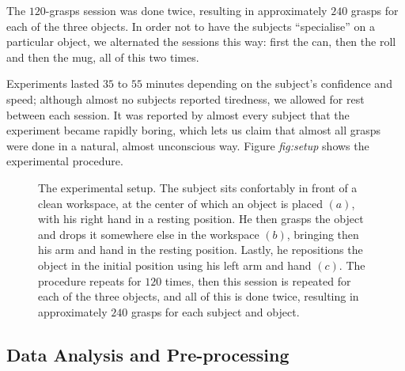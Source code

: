 The $120$-grasps session was done twice, resulting in approximately
$240$ grasps for each of the three objects. In order not to have the
subjects ``specialise'' on a particular object, we alternated the
sessions this way: first the can, then the roll and then the mug, all
of this two times.

Experiments lasted $35$ to $55$ minutes depending on the subject's
confidence and speed; although almost no subjects reported tiredness,
we allowed for rest between each session. It was reported by almost
every subject that the experiment became rapidly boring, which lets us
claim that almost all grasps were done in a natural, almost
unconscious way. Figure \emph{fig:setup} shows the experimental
procedure.

\begin{figure}[htbp]
  \begin{center}
    \caption{The experimental setup. The subject sits confortably in
    front of a clean workspace, at the center of which an object is
    placed $(a)$, with his right hand in a resting position. He then
    grasps the object and drops it somewhere else in the workspace
    $(b)$, bringing then his arm and hand in the resting
    position. Lastly, he repositions the object in the initial
    position using his left arm and hand $(c)$. The procedure repeats
    for $120$ times, then this session is repeated for each of the
    three objects, and all of this is done twice, resulting in
    approximately $240$ grasps for each subject and object.}
    \label{fig:setup}
  \end{center}
\end{figure}

\subsection*{Data Analysis and Pre-processing}
